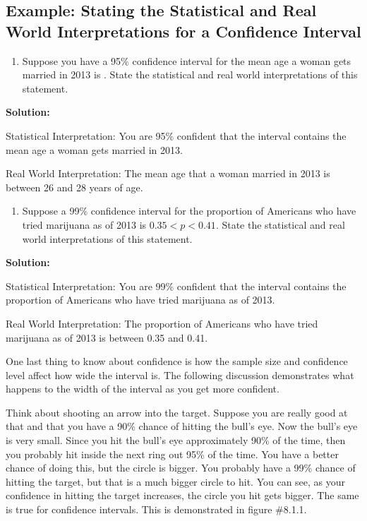 \documentclass[]{book}
\providecommand{\tightlist}{%
  \setlength{\itemsep}{0pt}\setlength{\parskip}{0pt}}
\begin{document}
\hypertarget{example-stating-the-statistical-and-real-world-interpretations-for-a-confidence-interval}{%
\subsection{Example: Stating the Statistical and Real World Interpretations for a Confidence Interval}\label{example-stating-the-statistical-and-real-world-interpretations-for-a-confidence-interval}}

\begin{enumerate}
\def\labelenumi{\alph{enumi}.}
\tightlist
\item
  Suppose you have a 95\% confidence interval for the mean age a woman gets married in 2013 is . State the statistical and real world interpretations of this statement.
\end{enumerate}

\textbf{Solution:}

Statistical Interpretation: You are 95\% confident that the interval contains the mean age a woman gets married in 2013.

Real World Interpretation: The mean age that a woman married in 2013 is between 26 and 28 years of age.

\begin{enumerate}
\def\labelenumi{\alph{enumi}.}
\setcounter{enumi}{1}
\tightlist
\item
  Suppose a 99\% confidence interval for the proportion of Americans who have tried marijuana as of 2013 is \(0.35<p<0.41\). State the statistical and real world interpretations of this statement.
\end{enumerate}

\textbf{Solution:}

Statistical Interpretation: You are 99\% confident that the interval contains the proportion of Americans who have tried marijuana as of 2013.

Real World Interpretation: The proportion of Americans who have tried marijuana as of 2013 is between 0.35 and 0.41.

One last thing to know about confidence is how the sample size and confidence level affect how wide the interval is. The following discussion demonstrates what happens to the width of the interval as you get more confident.

Think about shooting an arrow into the target. Suppose you are really good at that and that you have a 90\% chance of hitting the bull's eye. Now the bull's eye is very small. Since you hit the bull's eye
approximately 90\% of the time, then you probably hit inside the next ring out 95\% of the time. You have a better chance of doing this, but the circle is bigger. You probably have a 99\% chance of hitting the target, but that is a much bigger circle to hit. You can see, as your confidence in hitting the target increases, the circle you hit gets bigger. The same is true for confidence intervals. This is demonstrated in figure \#8.1.1.
\end{document}
